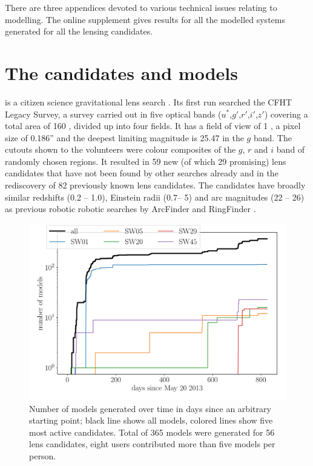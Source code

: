 There are three appendices devoted to various technical issues
relating to modelling.
The online supplement gives results for all the modelled systems generated
for all the lensing candidates.




\section{The candidates and models}
\label{sec:candidates_models}

\SW is a citizen science gravitational lens search \citep{2016MNRAS.455.1171M}.
Its first run searched the CFHT Legacy Survey, a survey carried out in five optical bands ($u^*$,$g'$,$r'$,$i'$,$z'$) covering a total area of 160 \sqdeg, divided up into four fields.
It has a field of view of 1 \sqdeg, a pixel size of 0.186'' and the deepest limiting magnitude is 25.47 in the $g$ band\citep{2012AJ....143...38G}.
The cutouts shown to the volunteers were colour composites of the $g$, $r$ and $i$ band of randomly chosen regions.
It resulted in 59 new (of which 29 promising) lens candidates that have not been found by other searches already and in the rediscovery of 82 previously known lens candidates.
The candidates have broadly similar redshifts (0.2 -- 1.0), Einstein radii (0.7\arcsec -- 5\arcsec) and arc magnitudes (22 -- 26) as previous robotic robotic searches by ArcFinder and RingFinder \citep{2016MNRAS.455.1191M}.

\begin{figure}
  \includegraphics[width=\linewidth]{img/timelapse3}
  \caption{ Number of models generated over time in days since an arbitrary starting point; black line shows all models, colored lines show five most active candidates. Total of 365 models were generated for 56 lens candidates, eight users contributed more than five models per person. }
  \label{fig:time}
\end{figure}

